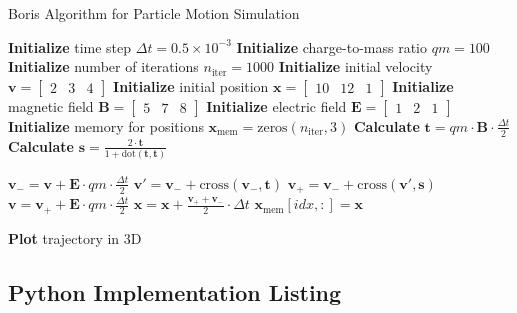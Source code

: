 \documentclass{article}
\begin{document}
\begin{algorithm}
    \caption{Boris Algorithm for Particle Motion Simulation}
    \begin{algorithmic}[1]
    \State \textbf{Initialize} time step $\Delta t = 0.5 \times 10^{-3}$
    \State \textbf{Initialize} charge-to-mass ratio $qm = 100$
    \State \textbf{Initialize} number of iterations $n_{\text{iter}} = 1000$
    \State \textbf{Initialize} initial velocity $\mathbf{v} = \begin{bmatrix} 2 & 3 & 4 \end{bmatrix}$
    \State \textbf{Initialize} initial position $\mathbf{x} = \begin{bmatrix} 10 & 12 & 1 \end{bmatrix}$
    \State \textbf{Initialize} magnetic field $\mathbf{B} = \begin{bmatrix} 5 & 7 & 8 \end{bmatrix}$
    \State \textbf{Initialize} electric field $\mathbf{E} = \begin{bmatrix} 1 & 2 & 1 \end{bmatrix}$
    \State \textbf{Initialize} memory for positions $\mathbf{x}_{\text{mem}} = \text{zeros}(n_{\text{iter}}, 3)$
    \State \textbf{Calculate} $\mathbf{t} = qm \cdot \mathbf{B} \cdot \frac{\Delta t}{2}$
    \State \textbf{Calculate} $\mathbf{s} = \frac{2 \cdot \mathbf{t}}{1 + \text{dot}(\mathbf{t}, \mathbf{t})}$
    
        \State $\mathbf{v}_{-} = \mathbf{v} + \mathbf{E} \cdot qm \cdot \frac{\Delta t}{2}$
        \State $\mathbf{v}' = \mathbf{v}_{-} + \text{cross}(\mathbf{v}_{-}, \mathbf{t})$
        \State $\mathbf{v}_{+} = \mathbf{v}_{-} + \text{cross}(\mathbf{v}', \mathbf{s})$
        \State $\mathbf{v} = \mathbf{v}_{+} + \mathbf{E} \cdot qm \cdot \frac{\Delta t}{2}$
        \State $\mathbf{x} = \mathbf{x} + \frac{\mathbf{v}_{+} + \mathbf{v}_{-}}{2} \cdot \Delta t$
        \State $\mathbf{x}_{\text{mem}}[idx, :] = \mathbf{x}$
    \EndFor
    
    \State \textbf{Plot} trajectory in 3D
    \end{algorithmic}
\end{algorithm}

\subsection{Python Implementation Listing}
\end{document}
